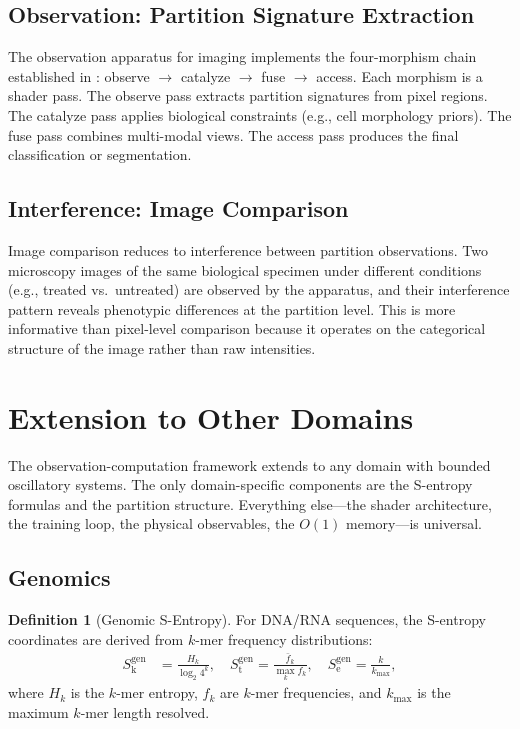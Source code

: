 \documentclass[11pt,twocolumn,a4paper]{article}
\theoremstyle{definition}
\newtheorem{definition}[theorem]{Definition}
\theoremstyle{remark}
\newcommand{\Sk}{S_{\mathrm{k}}}
\newcommand{\St}{S_{\mathrm{t}}}
\newcommand{\Se}{S_{\mathrm{e}}}
\begin{document}
\subsection{Observation: Partition Signature Extraction}

The observation apparatus for imaging implements the four-morphism chain established in \citet{sachikonye2025_partition}: observe $\to$ catalyze $\to$ fuse $\to$ access. Each morphism is a shader pass. The observe pass extracts partition signatures from pixel regions. The catalyze pass applies biological constraints (e.g., cell morphology priors). The fuse pass combines multi-modal views. The access pass produces the final classification or segmentation.

\subsection{Interference: Image Comparison}

Image comparison reduces to interference between partition observations. Two microscopy images of the same biological specimen under different conditions (e.g., treated vs.\ untreated) are observed by the apparatus, and their interference pattern reveals phenotypic differences at the partition level. This is more informative than pixel-level comparison because it operates on the categorical structure of the image rather than raw intensities.


\section{Extension to Other Domains}
\label{sec:extensions}

The observation-computation framework extends to any domain with bounded oscillatory systems. The only domain-specific components are the S-entropy formulas and the partition structure. Everything else---the shader architecture, the training loop, the physical observables, the $O(1)$ memory---is universal.

\subsection{Genomics}

\begin{definition}[Genomic S-Entropy]
For DNA/RNA sequences, the S-entropy coordinates are derived from $k$-mer frequency distributions:
\begin{align}
\Sk^{\mathrm{gen}} &= \frac{H_k}{\log_2 4^k}, \quad \St^{\mathrm{gen}} = \frac{\bar{f}_k}{\max_k f_k}, \quad \Se^{\mathrm{gen}} = \frac{k}{k_{\max}},
\end{align}
where $H_k$ is the $k$-mer entropy, $f_k$ are $k$-mer frequencies, and $k_{\max}$ is the maximum $k$-mer length resolved.
\end{definition}
\end{document}
